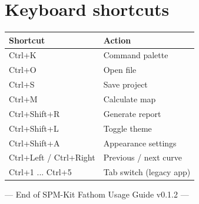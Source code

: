 \documentclass[a4paper,11pt]{article}
\begin{document}
\section{Keyboard shortcuts}

\begin{tabularx}{\linewidth}{@{}>{\ttfamily}l X@{}}
\toprule
Shortcut & Action \\
\midrule
Ctrl+K & Command palette \\
Ctrl+O & Open file \\
Ctrl+S & Save project \\
Ctrl+M & Calculate map \\
Ctrl+Shift+R & Generate report \\
Ctrl+Shift+L & Toggle theme \\
Ctrl+Shift+A & Appearance settings \\
Ctrl+Left / Ctrl+Right & Previous / next curve \\
Ctrl+1 ... Ctrl+5 & Tab switch (legacy app) \\
\bottomrule
\end{tabularx}

\vfill

\begin{center}
{\small --- End of SPM-Kit {\textperiodcentered} Fathom Usage Guide v0.1.2 ---}
\end{center}
\end{document}
